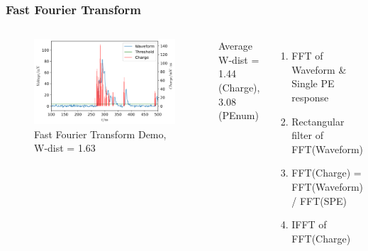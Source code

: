 \documentclass{beamer}
\begin{document}
\begin{frame}
\frametitle{Fast Fourier Transform}
\begin{columns}
\begin{figure}
    \centering
    \caption{Fast Fourier Transform Demo, W-dist = 1.63}
    \includegraphics[width=1.0\linewidth]{img/fftrans.png}
\end{figure}
\vspace{-4mm}
\begin{center}
    Average W-dist = 1.44 (Charge), 3.08 (PEnum)
\end{center}
\begin{enumerate}
    \item FFT of Waveform \& Single PE response
    \item Rectangular filter of FFT(Waveform)
    \item FFT(Charge) = FFT(Waveform) / FFT(SPE)
    \item IFFT of FFT(Charge)
\end{enumerate}
\end{columns}
\end{frame}
\end{document}
